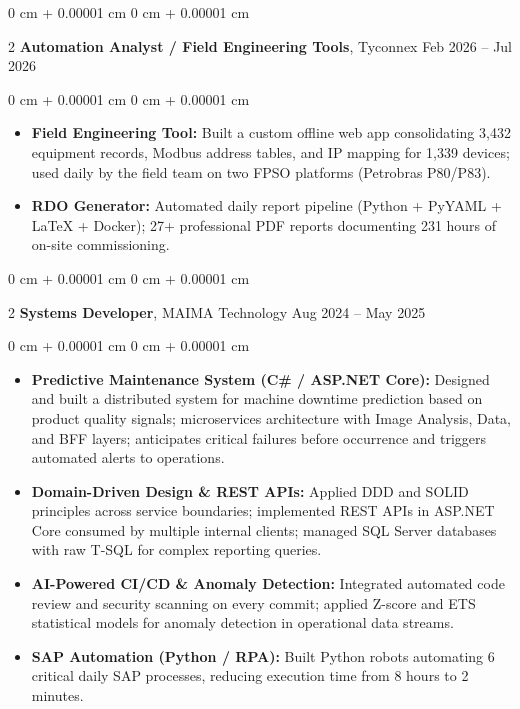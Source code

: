 \documentclass[10pt, letterpaper]{article}
\newenvironment{highlights}{ \begin{itemize}[ topsep=0.10 cm, parsep=0.10 cm, partopsep=0pt,
itemsep=0pt, leftmargin=0 cm + 10pt ] }{ \end{itemize} }
\newenvironment{onecolentry}{ \begin{adjustwidth}{ 0 cm + 0.00001 cm }{ 0 cm + 0.00001 cm }
}{ \end{adjustwidth} }
\newenvironment{twocolentry}[2][]{ \onecolentry \def\secondColumn{#2} \setcolumnwidth{\fill, 4.5 cm}
\begin{paracol}{2} }{ \switchcolumn \raggedleft \secondColumn \end{paracol}
\endonecolentry }
\begin{document}
	\vspace{0.2 cm}

	\begin{twocolentry}
		{ Feb 2026 -- Jul 2026 } \textbf{Automation Analyst / Field Engineering Tools}, Tyconnex
	\end{twocolentry}

	\vspace{0.10 cm}
	\begin{onecolentry}
		\begin{highlights}
			\item \textbf{Field Engineering Tool:} Built a custom offline web app consolidating 3,432 equipment records, Modbus address tables, and IP mapping for 1,339 devices; used daily by the field team on two FPSO platforms (Petrobras P80/P83).
			\item \textbf{RDO Generator:} Automated daily report pipeline (Python + PyYAML + LaTeX + Docker); 27+ professional PDF reports documenting 231 hours of on-site commissioning.
		\end{highlights}
	\end{onecolentry}

	\vspace{0.2 cm}

	\begin{twocolentry}
		{ Aug 2024 -- May 2025 } \textbf{Systems Developer}, MAIMA Technology
	\end{twocolentry}

	\vspace{0.10 cm}
	\begin{onecolentry}
		\begin{highlights}
			\item \textbf{Predictive Maintenance System (C\# / ASP.NET Core):} Designed and built a distributed system for machine downtime prediction based on product quality signals; microservices architecture with Image Analysis, Data, and BFF layers; anticipates critical failures before occurrence and triggers automated alerts to operations.
			\item \textbf{Domain-Driven Design \& REST APIs:} Applied DDD and SOLID principles across service boundaries; implemented REST APIs in ASP.NET Core consumed by multiple internal clients; managed SQL Server databases with raw T-SQL for complex reporting queries.
			\item \textbf{AI-Powered CI/CD \& Anomaly Detection:} Integrated automated code review and security scanning on every commit; applied Z-score and ETS statistical models for anomaly detection in operational data streams.
			\item \textbf{SAP Automation (Python / RPA):} Built Python robots automating 6 critical daily SAP processes, reducing execution time from 8 hours to 2 minutes.
		\end{highlights}
	\end{onecolentry}
\end{document}
